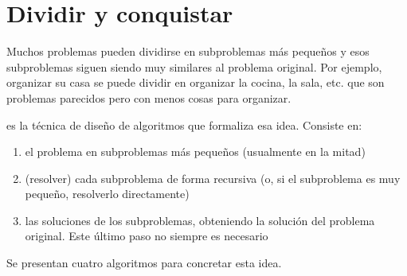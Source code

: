 \section{Dividir y conquistar}

Muchos problemas pueden dividirse en subproblemas más pequeños y esos subproblemas siguen siendo muy similares al problema original. Por ejemplo, organizar su casa se puede dividir en organizar la cocina, la sala, etc. que son problemas parecidos pero con menos cosas para organizar.

 es la técnica de diseño de algoritmos que formaliza esa idea. Consiste en:
\begin{enumerate}
    \item {} el problema en subproblemas más pequeños (usualmente en la mitad)
    \item {} (resolver) cada subproblema de forma recursiva (o, si el subproblema es muy pequeño, resolverlo directamente)
    \item {} las soluciones de los subproblemas, obteniendo la solución del problema original. Este último paso no siempre es necesario
\end{enumerate}

Se presentan cuatro algoritmos para concretar esta idea.






\begin{ejercicios}
\end{ejercicios}
